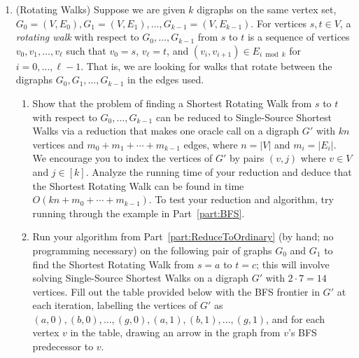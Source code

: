 \documentclass[11pt]{article}
\begin{document}
\begin{enumerate}
    \item  (Rotating Walks)  
    Suppose we are given $k$ digraphs on the same vertex set, $G_0=(V,E_0), G_1=(V,E_1), \ldots, G_{k-1}=(V,E_{k-1})$.  For vertices $s,t\in V$, a {\em rotating walk} with respect to $G_0,\ldots,G_{k-1}$ from $s$ to $t$ is a sequence of vertices $v_0,v_1,\ldots,v_{\ell}$ such that $v_0=s$, $v_\ell=t$, and $(v_i,v_{i+1})\in E_{i \bmod k}$ for $i=0,\ldots,\ell-1$.  That is, we are looking for walks that rotate between the digraphs $G_0,G_1,\ldots,G_{k-1}$ in the edges used.
    \begin{enumerate}
        \item Show that the problem of finding a Shortest Rotating Walk from $s$ to $t$ with respect to $G_0,\ldots,G_{k-1}$ 
        can be reduced to Single-Source Shortest Walks via a reduction that makes one oracle call on 
        a digraph $G'$ with $kn$ vertices and $m_0+m_1+\cdots+m_{k-1}$ edges, where $n=|V|$ and $m_i=|E_i|$.
        We encourage you to index the vertices of $G'$ by pairs $(v,j)$ where $v\in V$ and $j\in [k]$. 
        Analyze the running time of your reduction and deduce that the Shortest Rotating Walk can be found in time $O(kn+m_0+\cdots+m_{k-1})$.
        \label{part:ReduceToOrdinary}  To test your reduction and algorithm, try running through the example in Part~\ref{part:BFS}.

        
        
        \item \label{part:BFS} 
        Run your algorithm from Part~\ref{part:ReduceToOrdinary} (by hand; no programming necessary) on the following pair of graphs $G_0$ and $G_1$ to find the Shortest Rotating Walk from $s=a$ to $t=c$; this will involve solving Single-Source Shortest Walks on a digraph $G'$ with $2\cdot 7=14$ vertices. Fill out the table provided below with the BFS frontier in $G'$ at each iteration, labelling the vertices of $G'$ as $(a, 0),(b, 0),\ldots,(g,0),(a,1),(b,1),\ldots,(g,1)$, and for each vertex $v$ in the table, drawing an arrow in the graph from $v$'s BFS predecessor to $v$. 


\end{enumerate}
\end{enumerate}
\end{document}
